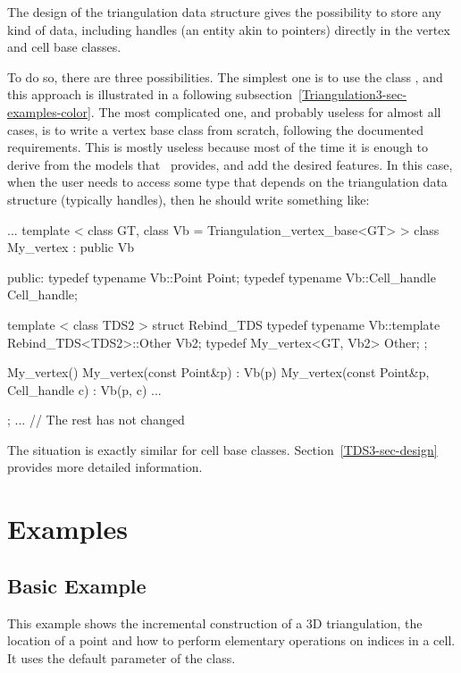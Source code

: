 {The design of the triangulation data structure gives the possibility to store
any kind of data, including handles (an entity akin to pointers) directly in
the vertex and cell base classes.

To do so, there are three possibilities.  The simplest one is to use the
class , and this approach is
illustrated in a following subsection~\ref{Triangulation3-sec-examples-color}.
The most complicated one, and probably useless for almost all cases, is to
write a vertex base class from scratch, following the documented requirements.
This is mostly useless because most of the time it is enough to derive from
the models that \cgal\ provides, and add the desired features.
In this case, when the user needs to access some type that depends on the
triangulation data structure (typically handles), then he should write
something like:
\begin{ccExampleCode}
...
template < class GT, class Vb = Triangulation_vertex_base<GT> >
class My_vertex
  : public Vb
{
public:
  typedef typename Vb::Point           Point;
  typedef typename Vb::Cell_handle     Cell_handle;

  template < class TDS2 >
  struct Rebind_TDS {
    typedef typename Vb::template Rebind_TDS<TDS2>::Other  Vb2;
    typedef My_vertex<GT, Vb2>                             Other;
  };

  My_vertex() {}
  My_vertex(const Point&p)                : Vb(p) {}
  My_vertex(const Point&p, Cell_handle c) : Vb(p, c) {}
...
};
... // The rest has not changed
\end{ccExampleCode}

The situation is exactly similar for cell base classes.
Section~\ref{TDS3-sec-design} provides more detailed information.

\section{Examples\label{Triangulation3-sec-examples}}
\subsection{Basic Example}
This example shows the incremental construction of a 3D triangulation, the
location of a point and how to perform elementary operations on indices in a
cell. It uses the default parameter of the  class.


}
